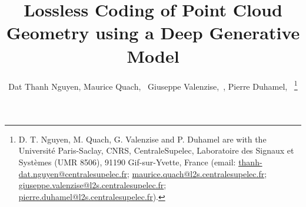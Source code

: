 \documentclass[journal]{IEEEtran}
\begin{document}
%
\title{Lossless Coding of Point Cloud Geometry using a Deep Generative Model}
%
%
%

\author{Dat Thanh Nguyen, Maurice Quach,~ Giuseppe Valenzise,~, Pierre Duhamel,~%
\thanks{D. T. Nguyen, M. Quach, G. Valenzise and P. Duhamel are with the Université Paris-Saclay, CNRS, CentraleSupelec, Laboratoire des Signaux et Systèmes (UMR 8506), 91190 Gif-sur-Yvette, France (email: \href{mailto:doandat.nguyen@gmail.com}{thanh-dat.nguyen@centralesupelec.fr}; \href{mailto:maurice.quach@l2s.centralesupelec.fr}{maurice.quach@l2s.centralesupelec.fr}; \href{mailto:giuseppe.valenzise@l2s.centralesupelec.fr}{giuseppe.valenzise@l2s.centralesupelec.fr}; \href{mailto:pierre.duhamel@l2s.centralesupelec.fr}{pierre.duhamel@l2s.centralesupelec.fr}).}}%





\maketitle

\begin{abstract}

\end{abstract}
\end{document}
